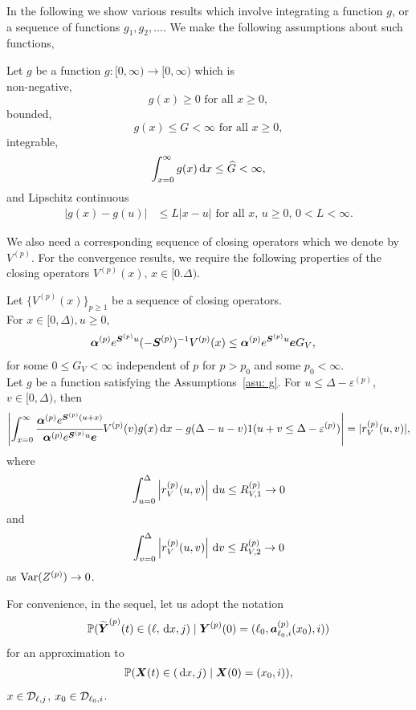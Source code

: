 In the following we show various results which involve integrating a function \(g\), or a sequence of functions \(g_1,g_2,\dots\). We make the following assumptions about such functions, 
\begin{asu}\label{asu: g}
	Let \(g\) be a function \(g:[0,\infty)\to [0,\infty)\) which is \\
	\subasu \label{asu: g non-neg} non-negative, 
	\[g(x) \geq 0 \mbox{ for all } x \geq 0,\]
	\subasu bounded, 
	\[g(x) \leq G < \infty \mbox{ for all } x \geq 0,\]
	\subasu integrable, 
	\[\int_{x=0}^\infty g(x)\, \mathrm{d} x \leq \widehat G < \infty,\]
	\subasu \label{asu: lipschitz} and Lipschitz continuous 
	\begin{align}
		|g(x) - g(u)|&\leq L|x - u| \mbox{ for all } x,\, u \geq 0,\, 0<L<\infty.
	\end{align}
\end{asu}

We also need a corresponding sequence of closing operators which we denote by \(V^{(p)}\). For the convergence results, we require the following properties of the closing operators \(V^{(p)}(x),\, x \in[0.\Delta)\).
\begin{property}\label{properties: some props}
	Let \(\{V^{(p)}(x)\}_{p\geq 1}\) be a sequence of closing operators. \\
	\subproperty \label{properties: 1} For \(x\in[0,\Delta),u\geq 0\),  
        \begin{align*}
        		\boldsymbol \alpha^{(p)} e^{\boldsymbol S^{(p)}u}(-\boldsymbol S^{(p)})^{-1} V^{(p)}(x) &\leq \boldsymbol \alpha^{(p)} e^{\boldsymbol S^{(p)}u} \boldsymbol e G_V,
	\end{align*}
	for some \(0\leq G_V<\infty\) independent of \(p\) for \(p>p_0\) and some \(p_0<\infty\). \\
	\subproperty \label{properties: 2} Let \(g\) be a function satisfying the Assumptions~\ref{asu: g}. For \(u\leq \Delta-\varepsilon^{(p)}\), \(v\in[0,\Delta)\), then
	\[\left|\int_{x=0}^\infty \cfrac{\boldsymbol \alpha^{(p)} e^{\boldsymbol{S}^{(p)}(u+x)} }{\boldsymbol \alpha^{(p)} e^{\boldsymbol{S}^{(p)}u} \boldsymbol e} V^{(p)}(v)g(x)\, \mathrm{d} x -g(\Delta-u-v) 1(u+v\leq\Delta-\varepsilon^{(p)})\right| =  |r_V^{(p)}(u,v)|,\]
	where 
	\[ \int_{u=0}^{\Delta}\left| r_V^{(p)}(u,v)\right| \, \mathrm{d} u  \leq R_{V,1}^{(p)} \to 0\]
	and 
	\[ \int_{v=0}^{\Delta}\left| r_V^{(p)}(u,v)\right| \, \mathrm{d} v  \leq R_{V,2}^{(p)} \to 0\]
	as \(\mathrm{Var}(Z^{(p)})\to 0\). 
\end{property}

For convenience, in the sequel, let us adopt the notation 
\begin{align}
	\mathbb P(\widetilde{\boldsymbol Y}^{(p)}(t) \in (\ell,\, \mathrm{d} x, j)\mid \boldsymbol Y^{(p)}(0)=(\ell_0, \boldsymbol  a_{\ell_0,i}^{(p)}(x_0),  i) )
\end{align}
for an approximation to 
\begin{align}
	\mathbb P(\boldsymbol X(t)\in(\, \mathrm{d} x, j)\mid \boldsymbol X(0)=(x_0, i)),
\end{align}
\(x\in \mathcal{D}_{\ell,j}\), \(x_0\in\mathcal{D}_{\ell_0,i}\).

